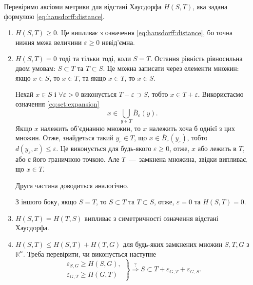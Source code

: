 Перевіримо аксіоми метрики для відстані Хаусдорфа $H \left( S, T \right) $,
яка задана формулою \eqref{eq:hausdorff:distance}.

\begin{enumerate}
  \item $H \left( S, T \right) \geq 0$.
  Це випливає з означення \eqref{eq:hausdorff:distance},
  бо точна нижня межа величини $ \varepsilon \geq 0$ невід'ємна.
  \item $H \left( S, T \right) = 0$ тоді та тільки тоді, коли $S = T$.
  Остання рівність рівносильна двом умовам: $S \subset T$ та $T \subset S$.
  Це можна записати через елементи множин:
  якщо $x \in S$, то $x \in T$, та якщо $x \in T$, то $x \in S$.

  Нехай $x \in S$ і $ \forall \varepsilon > 0$ виконується
  $T + \varepsilon \supset S$, тобто $x \in T + \varepsilon $.
  Використаємо означення \eqref{eq:set:expansion}
  \begin{equation*}
    x \in
    \bigcup \limits_{y \in T} \overline{B}_{ \varepsilon } \left( y \right).
  \end{equation*}
  Якщо $x$ належить об'єднанню множин,
  то $x$ належить хоча б однієї з цих множин.
  Отже, знайдеться такий $y_{ \varepsilon } \in T$,
  що $x \in \overline{B}_{ \varepsilon } \left( y_{ \varepsilon } \right) $,
  тобто $d \left( y_{ \varepsilon }, x \right) \leq \varepsilon $.
  Це виконується для будь-якого $ \varepsilon \geq 0$, отже,
  $x$ або лежить в $T$, або є його граничною точкою.
  Але $T$~---~замкнена множина, звідки випливає, що $x \in T$.

  Друга частина доводиться аналогічно.

  З іншого боку, якщо $S = T$, то $S \subset T$ та $T \subset S$,
  отже, $ \varepsilon = 0$ та $H \left( S, T \right) = 0$.
  \item $H \left( S, T \right) = H \left( T, S \right) $
  випливає з симетричності означення відстані Хаусдорфа.
  \item $H \left( S, T \right) \leq
    H \left( S, T \right) + H \left( T, G \right) $
  для будь-яких замкнених множин $S, T, G$ з $ \mathbb{R}^n$.
  Треба перевірити, чи виконується наступне
  \begin{equation*}\label{eq:triangle}
    \left. \begin{aligned}
      \varepsilon_{S, G} \geq H \left( S, G \right), \\
      \varepsilon_{G, T} \geq H \left( G, T \right)
    \end{aligned} \right \rbrace \overset{?}{\Rightarrow}
    S \subset T + \varepsilon_{G, T} + \varepsilon_{G, S}.
  \end{equation*}


\end{enumerate}
